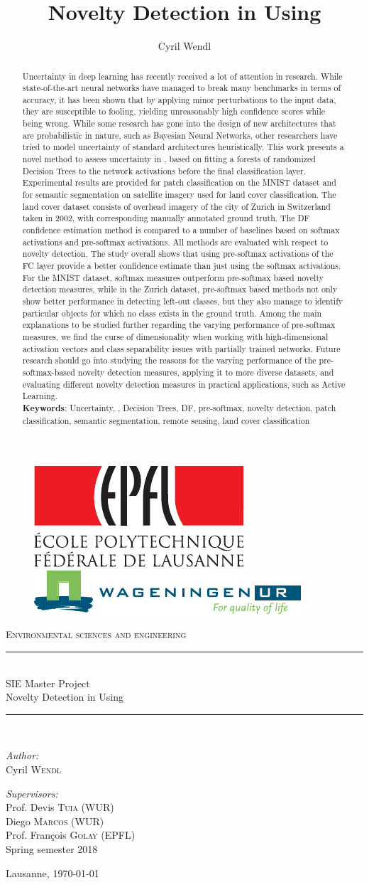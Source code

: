 \documentclass[10pt]{article}
\author{Cyril Wendl}
\title{Novelty Detection in \acrlongpl{CNN} Using \acrlongpl{DF}
}
\newcommand{\maketitlepage}{
    \begin{titlepage}
    	\begin{center}
    		\begin{figure}[H]
    			\centering
    			\includegraphics[height=.09\textwidth]{logo} 
    			\hspace{1cm}
    			\includegraphics[height=.07\textwidth]{logo_wur_quality_of_life}
    		\end{figure}
    		\textsc{Environmental sciences and engineering}\\[0.5cm]
    		
    		\newcommand{\HRule}{\rule{\linewidth}{0.2mm}}
    		\HRule \\[0.5cm]
    		{\large SIE Master Project}\\[0.2cm]
    		{\huge Novelty Detection in \acrlongpl{CNN} Using \acrlongpl{DF}
    		}\\[0.5cm]
    		\HRule \\[0.5cm]
    		
    		\begin{minipage}[t]{0.45\textwidth}
    			\begin{flushleft} \large
    				\emph{Author:}\\[0.2cm]
    				Cyril \textsc{Wendl}
    			\end{flushleft}
    		\end{minipage}
    		\hfill
    		\begin{minipage}[t]{0.45\textwidth}
    			\begin{flushright} \large
    				\emph{Supervisors:}\\[0.2cm]
    				Prof. Devis \textsc{Tuia} (WUR)\\
    				Diego \textsc{Marcos} (WUR)\\
    				Prof. François \textsc{Golay} (EPFL)\\
    				Spring semester 2018
    			\end{flushright}
    		\end{minipage}
    		\vfill
    		
    		{\large Lausanne, \today}
    	\end{center}
    \end{titlepage}
}
\begin{document}
\maketitlepage

\vfill
\maketitle
\thispagestyle{empty}
\begin{abstract}
	Uncertainty in deep learning has recently received a lot of attention in research. While state-of-the-art neural networks have managed to break many benchmarks in terms of accuracy, it has been shown that by applying minor perturbations to the input data, they are susceptible to fooling, yielding unreasonably high confidence scores while being wrong. While some research has gone into the design of new architectures that are probabilistic in nature, such as Bayesian Neural Networks, other researchers have tried to model uncertainty of standard architectures heuristically. This work presents a novel method to assess uncertainty in , based on fitting a forests of randomized Decision Trees to the network activations before the final classification layer. Experimental results are provided for patch classification on the \acrshort{MNIST} dataset and for semantic segmentation on satellite imagery used for land cover classification. The land cover dataset consists of overhead imagery of the city of Zurich in Switzerland taken in 2002, with corresponding manually annotated ground truth. The \acrlong{DF} confidence estimation method is compared to a number of baselines based on softmax activations and pre-softmax activations. All methods are evaluated with respect to novelty detection. The study overall shows that using pre-softmax activations of the \acrlong{FC} layer provide a better confidence estimate than just using the softmax activations. For the \acrshort{MNIST} dataset, softmax measures outperform pre-softmax based novelty detection measures, while in the Zurich dataset, pre-softmax based methods not only show better performance in detecting left-out classes, but they also manage to identify particular objects for which no class exists in the ground truth. Among the main explanations to be studied further regarding the varying performance of pre-softmax measures, we find the curse of dimensionality when working with high-dimensional activation vectors and class separability issues with partially trained networks. Future research should go into studying the reasons for the varying performance of the pre-softmax-based novelty detection measures, applying it to more diverse datasets, and evaluating different novelty detection measures in practical applications, such as Active Learning.\\
	
	\textbf{Keywords}: Uncertainty, , Decision Trees, \acrlong{DF}, pre-softmax, novelty detection, patch classification, semantic segmentation, remote sensing, land cover classification
\end{abstract}
\vfill
\newpage
\end{document}
